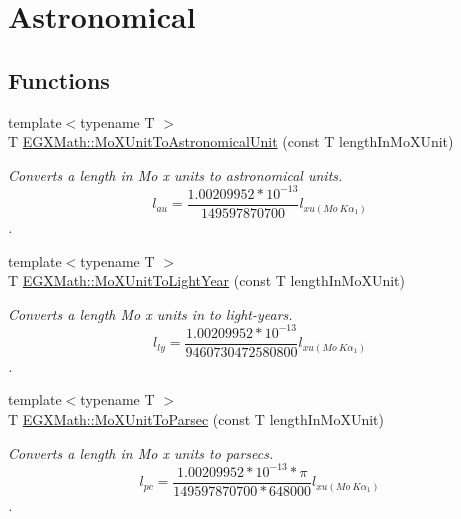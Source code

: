 \hypertarget{group___e_g_x_math-_conversions-_length_conversions-_non-_s_i-_mo_x_unit-_astronomical}{}\section{Astronomical}
\label{group___e_g_x_math-_conversions-_length_conversions-_non-_s_i-_mo_x_unit-_astronomical}
\subsection*{Functions}
\begin{DoxyCompactItemize}
\item 
{\footnotesize template$<$typename T $>$ }\\T \mbox{\hyperlink{group___e_g_x_math-_conversions-_length_conversions-_non-_s_i-_mo_x_unit-_astronomical_ga7a72c84200a6ae279a9fe7499db6e7f1}{E\+G\+X\+Math\+::\+Mo\+X\+Unit\+To\+Astronomical\+Unit}} (const T length\+In\+Mo\+X\+Unit)
\begin{DoxyCompactList}\small\item\em Converts a length in Mo x units to astronomical units. \[ l_{au}= \frac{1.00209952*10^{-13}}{149597870700} l_{xu(Mo\ K\alpha_1)} \]. \end{DoxyCompactList}\item 
{\footnotesize template$<$typename T $>$ }\\T \mbox{\hyperlink{group___e_g_x_math-_conversions-_length_conversions-_non-_s_i-_mo_x_unit-_astronomical_ga5b2db9c0d1b2663190463aaf3203a27f}{E\+G\+X\+Math\+::\+Mo\+X\+Unit\+To\+Light\+Year}} (const T length\+In\+Mo\+X\+Unit)
\begin{DoxyCompactList}\small\item\em Converts a length Mo x units in to light-\/years. \[ l_{ly}= \frac{1.00209952*10^{-13}}{9460730472580800} l_{xu(Mo\ K\alpha_1)} \]. \end{DoxyCompactList}\item 
{\footnotesize template$<$typename T $>$ }\\T \mbox{\hyperlink{group___e_g_x_math-_conversions-_length_conversions-_non-_s_i-_mo_x_unit-_astronomical_ga257eaf0a2f8f74aca2917964524d486d}{E\+G\+X\+Math\+::\+Mo\+X\+Unit\+To\+Parsec}} (const T length\+In\+Mo\+X\+Unit)
\begin{DoxyCompactList}\small\item\em Converts a length in Mo x units to parsecs. \[ l_{pc}=\frac{1.00209952*10^{-13} * \pi}{149597870700 * 648000} l_{xu(Mo\ K\alpha_1)} \]. \end{DoxyCompactList}\end{DoxyCompactItemize}


